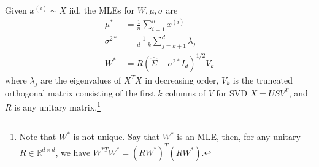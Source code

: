   \begin{corollary}
    Given $x^{(i)} \sim X$ iid, the MLEs for $W, \mu, \sigma$ are 
    \begin{align}
      \mu^\ast & = \frac{1}{n} \sum_{i=1}^n x^{(i)} \\
      \sigma^{2 \ast} & = \frac{1}{d-k} \sum_{j=k+1}^d \lambda_j \\
      W^\ast & = R (\hat{\Sigma} - \sigma^{2 \ast} I_d )^{1/2} V_k
    \end{align}
    where $\lambda_j$ are the eigenvalues of $X^T X$ in decreasing order, $V_k$ is the truncated orthogonal matrix consisting of the first $k$ columns of $V$ for SVD $X = U S V^T$, and $R$ is any unitary matrix.\footnote{Note that $W^{\ast}$ is not unique. Say that $W^\ast$ is an MLE, then, for any unitary $R \in \mathbb{R}^{d \times d}$, we have $W^{\ast T} W^\ast = (R W^\ast)^T (R W^\ast)$.} 
  \end{corollary}
